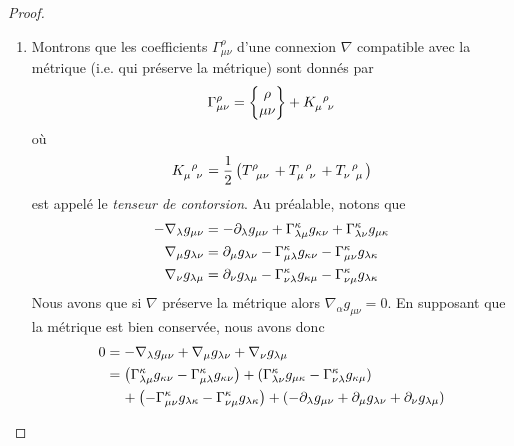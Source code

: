 \documentclass[a4paper,11pt]{report}
\begin{document}
\begin{proof}
\begin{enumerate}[label = \textit{\roman*)}]
                            \item Montrons que les coefficients $\Gamma^\rho_{\mu\nu}$ d'une connexion $\nabla$ compatible avec la métrique (i.e. qui préserve la métrique) sont donnés par 
                            \begin{equation}
                                \Gamma^\rho_{\mu\nu} = \chris{\rho}{\mu}{\nu}+
                                K\indices{_\mu^\rho_\nu}
                            \end{equation}
                            où
                            \begin{equation}
                                K\indices{_\mu^\rho_\nu} = \frac{1}{2}\left( T\indices{^\rho_\mu_\nu}+T\indices{_\mu^\rho_\nu} + T\indices{_\nu^\rho_\mu} \right)
                            \end{equation}
                            est appelé le \textit{tenseur de contorsion}. Au préalable, notons que 
                            \begin{align}
                                -\nabla_{\lambda}g_{\mu\nu} &= -\partial_\lambda g_{\mu\nu}+\Gamma^\kappa_{\lambda\mu}g_{\kappa\nu}+\Gamma^\kappa_{\lambda\nu}g_{\mu\kappa}\\
                                \nabla_{\mu}g_{\lambda\nu} &= \partial_\mu g_{\lambda\nu}-\Gamma^\kappa_{\mu\lambda}g_{\kappa\nu}-\Gamma^\kappa_{\mu\nu}g_{\lambda\kappa}\\
                                \nabla_{\nu}g_{\lambda\mu} &= \partial_\nu g_{\lambda\mu}-\Gamma^\kappa_{\nu\lambda}g_{\kappa\mu}-\Gamma^\kappa_{\nu\mu}g_{\lambda\kappa}
                            \end{align}
                            Nous avons que si $\nabla$ préserve la métrique alors $\nabla_{\alpha}g_{\mu\nu} = 0$. En supposant que la métrique est bien conservée, nous avons donc
                            \begin{align}
                                 0 &=  -\nabla_{\lambda}g_{\mu\nu}+ \nabla_{\mu}g_{\lambda\nu}+ \nabla_{\nu}g_{\lambda\mu}\\
                                 &= \left(\Gamma^\kappa_{\lambda\mu}g_{\kappa\nu} -\Gamma^\kappa_{\mu\lambda}g_{\kappa\nu}\right) +\left(\Gamma^\kappa_{\lambda\nu}g_{\mu\kappa} -\Gamma^\kappa_{\nu\lambda}g_{\kappa\mu}\right)\\
                                 &\hspace{0.4cm}+\left(-\Gamma^\kappa_{\mu\nu}g_{\lambda\kappa}-\Gamma^\kappa_{\nu\mu}g_{\lambda\kappa}\right) + \left( -\p_\lambda g_{\mu\nu}+\p_\mu g_{\lambda\nu} + \p_\nu g_{\lambda\mu}\right)\\

\end{align}
\end{enumerate}
\end{proof}
\end{document}
